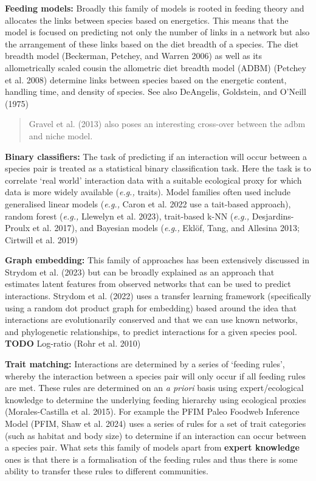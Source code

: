 \documentclass[
  letterpaper,
  DIV=11,
  numbers=noendperiod]{scrartcl}
\begin{document}
\textbf{Feeding models:} Broadly this family of models is rooted in
feeding theory and allocates the links between species based on
energetics. This means that the model is focused on predicting not only
the number of links in a network but also the arrangement of these links
based on the diet breadth of a species. The diet breadth model
(Beckerman, Petchey, and Warren 2006) as well as its allometrically
scaled cousin the allometric diet breadth model (ADBM) (Petchey et al.
2008) determine links between species based on the energetic content,
handling time, and density of species. See also DeAngelis, Goldstein,
and O'Neill (1975)

\begin{quote}
Gravel et al. (2013) also poses an interesting cross-over between the
adbm and niche model.
\end{quote}

\textbf{Binary classifiers:} The task of predicting if an interaction
will occur between a species pair is treated as a statistical binary
classification task. Here the task is to correlate `real world'
interaction data with a suitable ecological proxy for which data is more
widely available (\emph{e.g.,} traits). Model families often used
include generalised linear models (\emph{e.g.,} Caron et al. 2022 use a
tait-based approach), random forest (\emph{e.g.,} Llewelyn et al. 2023),
trait-based k-NN (\emph{e.g.,} Desjardins-Proulx et al. 2017), and
Bayesian models (\emph{e.g.,} Eklöf, Tang, and Allesina 2013; Cirtwill
et al. 2019)

\textbf{Graph embedding:} This family of approaches has been extensively
discussed in Strydom et al. (2023) but can be broadly explained as an
approach that estimates latent features from observed networks that can
be used to predict interactions. Strydom et al. (2022) uses a transfer
learning framework (specifically using a random dot product graph for
embedding) based around the idea that interactions are evolutionarily
conserved and that we can use known networks, and phylogenetic
relationships, to predict interactions for a given species pool.
\textbf{TODO} Log-ratio (Rohr et al. 2010)

\textbf{Trait matching:} Interactions are determined by a series of
`feeding rules', whereby the interaction between a species pair will
only occur if all feeding rules are met. These rules are determined on
an \emph{a priori} basis using expert/ecological knowledge to determine
the underlying feeding hierarchy using ecological proxies
(Morales-Castilla et al. 2015). For example the PFIM Paleo Foodweb
Inference Model (PFIM, Shaw et al. 2024) uses a series of rules for a
set of trait categories (such as habitat and body size) to determine if
an interaction can occur between a species pair. What sets this family
of models apart from \textbf{expert knowledge} ones is that there is a
formalisation of the feeding rules and thus there is some ability to
transfer these rules to different communities.
\end{document}
